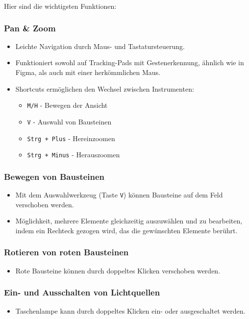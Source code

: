 \documentclass[a4paper,10pt,ngerman]{scrartcl}
\begin{document}
Hier sind die wichtigsten Funktionen:

\subsubsection*{Pan \& Zoom}
\begin{itemize}
    \item Leichte Navigation durch Maus- und Tastatursteuerung.
    \item Funktioniert sowohl auf Tracking-Pads mit Gestenerkennung, ähnlich wie in Figma, als auch mit einer herkömmlichen Maus.
    \item Shortcuts ermöglichen den Wechsel zwischen Instrumenten:
    \begin{itemize}
        \item \texttt{M/H} - Bewegen der Ansicht
        \item \texttt{V} - Auswahl von Bausteinen
        \item \texttt{Strg + Plus} - Hereinzoomen
        \item \texttt{Strg + Minus} - Herauszoomen
    \end{itemize}
\end{itemize}

\subsubsection*{Bewegen von Bausteinen}
\begin{itemize}
    \item Mit dem Auswahlwerkzeug (Taste \texttt{V}) können Bausteine auf dem Feld verschoben werden.
    \item Möglichkeit, mehrere Elemente gleichzeitig auszuwählen und zu bearbeiten, indem ein Rechteck gezogen wird, das die gewünschten Elemente berührt.
\end{itemize}

\subsubsection*{Rotieren von roten Bausteinen}
\begin{itemize}
    \item Rote Bausteine können durch doppeltes Klicken verschoben werden.
\end{itemize}

\subsubsection*{Ein- und Ausschalten von Lichtquellen}
\begin{itemize}
    \item Taschenlampe kann durch doppeltes Klicken ein- oder ausgeschaltet werden.
\end{itemize}
\end{document}
